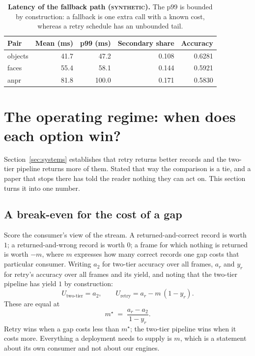 \documentclass[11pt,a4paper]{article}
\newcommand{\synth}{\textsc{synthetic}}
\begin{document}
\begin{table}[t]
\centering\small
\begin{tabular}{lrrrr}
\toprule
\textbf{Pair} & \textbf{Mean (ms)} & \textbf{p99 (ms)} & \textbf{Secondary share} & \textbf{Accuracy} \\
\midrule
objects & 41.7 & 47.2 & 0.108 & 0.6281 \\
faces   & 55.4 & 58.1 & 0.144 & 0.5921 \\
anpr    & 81.8 & 100.0 & 0.171 & 0.5830 \\
\bottomrule
\end{tabular}
\caption{\textbf{Latency of the fallback path (\synth).} The p99 is bounded by
construction: a fallback is one extra call with a known cost, whereas a retry
schedule has an unbounded tail.}
\label{tab:latency}
\end{table}

\section{The operating regime: when does each option win?}
\label{sec:regime}

Section~\ref{sec:systems} establishes that retry returns better records and the
two-tier pipeline returns more of them. Stated that way the comparison is a tie,
and a paper that stops there has told the reader nothing they can act on. This
section turns it into one number.

\subsection{A break-even for the cost of a gap}

Score the consumer's view of the stream. A returned-and-correct record is worth
$1$; a returned-and-wrong record is worth $0$; a frame for which nothing is
returned is worth $-m$, where $m$ expresses how many correct records one gap costs
that particular consumer. Writing $a_2$ for two-tier accuracy over all frames,
$a_r$ and $y_r$ for retry's accuracy over all frames and its yield, and noting
that the two-tier pipeline has yield $1$ by construction:
\[
  U_{\text{two-tier}} = a_2, \qquad
  U_{\text{retry}} = a_r - m\,(1 - y_r).
\]
These are equal at
\begin{equation}
  m^\star \;=\; \frac{a_r - a_2}{1 - y_r}.
  \label{eq:mstar}
\end{equation}
Retry wins when a gap costs less than $m^\star$; the two-tier pipeline wins when
it costs more. Everything a deployment needs to supply is $m$, which is a
statement about its own consumer and not about our engines.
\end{document}
